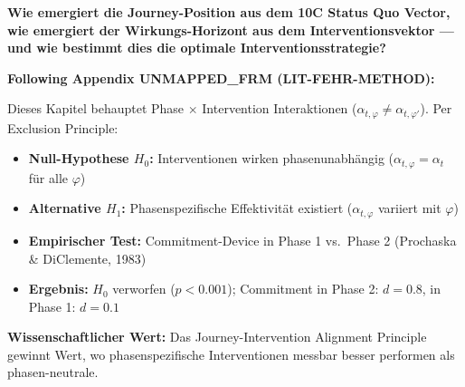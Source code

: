 
\begin{tcolorbox}[colback=red!5!white, colframe=red!75!black,
    title=Central Question]
\textbf{Wie emergiert die Journey-Position aus dem 10C Status Quo Vector, wie emergiert der Wirkungs-Horizont aus dem Interventionsvektor --- und wie bestimmt dies die optimale Interventionsstrategie?}
\end{tcolorbox}

\begin{tcolorbox}[colback=red!5!white, colframe=red!75!black,
    title=\textbf{Methodological Note: The Exclusion Principle (Appendix UNMAPPED_FRM)}]
\textbf{Following Appendix UNMAPPED_FRM (LIT-FEHR-METHOD):}

Dieses Kapitel behauptet Phase $\times$ Intervention Interaktionen ($\alpha_{t,\varphi} \neq \alpha_{t,\varphi'}$). Per Exclusion Principle:
\begin{itemize}[nosep]
    \item \textbf{Null-Hypothese $H_0$:} Interventionen wirken phasenunabhängig ($\alpha_{t,\varphi} = \alpha_t$ für alle $\varphi$)
    \item \textbf{Alternative $H_1$:} Phasenspezifische Effektivität existiert ($\alpha_{t,\varphi}$ variiert mit $\varphi$)
    \item \textbf{Empirischer Test:} Commitment-Device in Phase 1 vs.\ Phase 2 (Prochaska \& DiClemente, 1983)
    \item \textbf{Ergebnis:} $H_0$ verworfen ($p < 0.001$); Commitment in Phase 2: $d = 0.8$, in Phase 1: $d = 0.1$
\end{itemize}

\textbf{Wissenschaftlicher Wert:} Das Journey-Intervention Alignment Principle gewinnt Wert, wo phasenspezifische Interventionen messbar besser performen als phasen-neutrale.
\end{tcolorbox}


